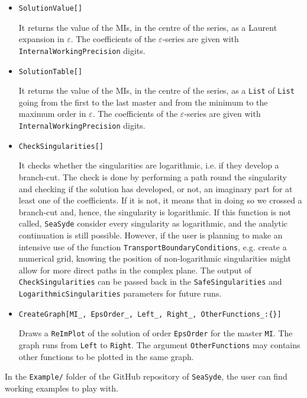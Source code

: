 \begin{itemize}
    \item \texttt{SolutionValue[]}
    
    It returns the value of the MIs, in the centre of the series, as a Laurent expansion in $\varepsilon$. The coefficients of the $\varepsilon$-series are given with \texttt{InternalWorkingPrecision} digits.
    
    \item \texttt{SolutionTable[]}
    
    It returns the value of the MIs, in the centre of the series, as a \texttt{List} of \texttt{List} going from the first to the last master and from the minimum to the maximum order in $\varepsilon$. The coefficients of the $\varepsilon$-series are given with \texttt{InternalWorkingPrecision} digits.
    
    \item \texttt{CheckSingularities[]}
    
    It checks whether the singularities are logarithmic, i.e. if they develop a branch-cut. The check is done by performing a path round the singularity and checking if the solution has developed, or not, an imaginary part for at least one of the coefficients. If it is not, it means that in doing so we crossed a branch-cut and, hence, the singularity is logarithmic. If this function is not called, \texttt{SeaSyde} consider every singularity as logarithmic, and the analytic continuation is still possible. However, if the user is planning to make an intensive use of the function \texttt{TransportBoundaryConditions}, e.g. create a numerical grid, knowing the position of non-logarithmic singularities might allow for more direct paths in the complex plane. The output of \texttt{CheckSingularities} can be passed back in the \texttt{SafeSingularities} and \texttt{LogarithmicSingularities} parameters for future runs.
    
    
    
    
    
    
    \item {\texttt{CreateGraph[MI\_, EpsOrder\_, Left\_, Right\_, OtherFunctions\_:\{\}]}}
    
    Draws a \texttt{ReImPlot} of the solution of order \texttt{EpsOrder} for the master \texttt{MI}. The graph runs from \texttt{Left} to \texttt{Right}. 
    The argument \texttt{OtherFunctions} may contains other functions to be plotted in the same graph.
\end{itemize}

In the \texttt{Example/} folder of the GitHub repository of \texttt{SeaSyde}, the user can find working examples to play with.
